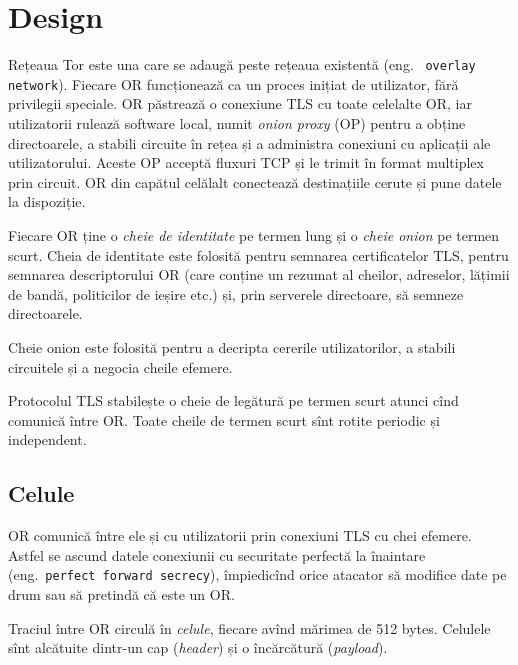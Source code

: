 
\chapter{Design}

\indent\indent Rețeaua Tor este una care se adaugă peste rețeaua existentă (eng.\ %
\texttt{overlay network}).  Fiecare OR funcționează
ca un proces inițiat de utilizator, fără privilegii speciale. OR păstrează
o conexiune TLS cu toate celelalte OR, iar utilizatorii rulează
software local, numit \emph{onion proxy} (OP)  pentru
a obține directoarele, a stabili circuite în rețea și a administra
conexiuni cu aplicații ale utilizatorului. Aceste OP acceptă fluxuri TCP
și le trimit în format multiplex prin circuit. OR din capătul celălalt
conectează destinațiile cerute și pune datele la dispoziție.

Fiecare OR ține o \textit{cheie de identitate} pe termen lung și o \textit{cheie onion}
pe termen scurt.  
Cheia de identitate este folosită pentru semnarea
certificatelor TLS, pentru semnarea descriptorului OR (care conține un
rezumat al cheilor, adreselor, lățimii de bandă, politicilor de ieșire etc.) și,
prin serverele directoare, să semneze directoarele.

Cheie onion este folosită pentru a decripta cererile utilizatorilor, a stabili
circuitele și a negocia cheile efemere.

Protocolul TLS stabilește o cheie de legătură pe termen scurt
atunci cînd comunică între OR. Toate cheile de termen scurt sînt rotite periodic
și independent.

\section{Celule}

\indent\indent OR comunică între ele și cu utilizatorii prin conexiuni TLS cu chei efemere.
Astfel se ascund datele conexiunii cu securitate perfectă la înaintare
(eng.\ \texttt{perfect forward secrecy}), împiedicînd orice atacator să
modifice date pe drum sau să pretindă că este un OR.

Traciul între OR circulă în \emph{celule}, fiecare avînd mărimea de 512 bytes.
Celulele sînt alcătuite dintr-un cap (\emph{header}) și o încărcătură
(\emph{payload}). 

